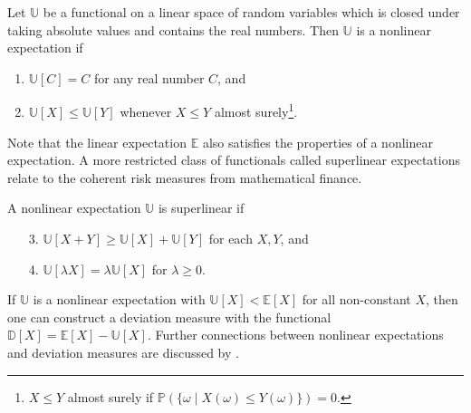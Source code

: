 \documentclass[main.tex]{subfiles}
\begin{document}
\begin{mydef}
  Let $\mathbb{U}$ be a functional on a linear space of random
  variables which is closed under taking absolute values and contains
  the real numbers.
  Then $\mathbb{U}$ is a nonlinear expectation if
  \begin{enumerate}
  \item $\mathbb{U}[C] = C$ for any real number $C$, and
  \item $\mathbb{U}[X]\leq \mathbb{U}[Y]$ whenever $X\leq Y$ almost
    surely\footnote{$X\leq Y$ almost surely if $\mathbb{P}(\{\omega\mid X(\omega)\leq Y(\omega)\})=0$.}.
  \end{enumerate}
\end{mydef}
Note that the linear expectation $\mathbb{E}$ also satisfies
the properties of a nonlinear expectation.
A more restricted class of functionals called superlinear expectations
relate to the coherent risk measures from mathematical finance.
\begin{mydef}
  A nonlinear expectation $\mathbb{U}$ is superlinear if
  \begin{enumerate}
  \item[3.] $\mathbb{U}[X+Y]\geq \mathbb{U}[X] +\mathbb{U}[Y]$ for
    each $X,Y$, and
  \item[4.] $\mathbb{U}[\lambda X] = \lambda\mathbb{U}[X]$ for
    $\lambda\geq 0$.
  \end{enumerate}
\end{mydef}

If $\mathbb{U}$ is a nonlinear expectation
with $\mathbb{U}[X] < \mathbb{E}[X]$ for all non-constant $X$,
then one can
construct a deviation measure with the functional
$\mathbb{D}[X]=\mathbb{E}[X]-\mathbb{U}[X]$.
Further connections between nonlinear expectations and deviation
measures are discussed by \citet{rockafellar2013fundamental}.
\end{document}
